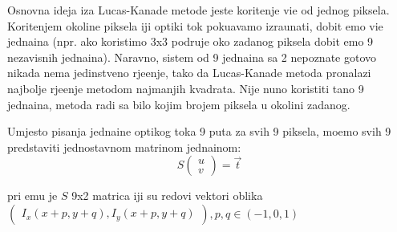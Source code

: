 Osnovna ideja iza Lucas-Kanade metode jeste kori\sh tenje vi\sh e od jednog piksela. Kori\sh tenjem okoline piksela \ch iji opti\ch ki tok poku\sh avamo izra\ch unati, dobit \cj emo vi\sh e jedna\ch ina
(npr. ako koristimo 3x3 podru\ch je oko zadanog piksela dobit \cj emo 9 nezavisnih jedna\ch ina). Naravno, sistem od 9 jedna\ch ina sa 2 nepoznate gotovo nikada nema jedinstveno rje\sh enje,
tako da Lucas-Kanade metoda pronalazi najbolje rje\sh enje metodom najmanjih kvadrata. Nije nu\zh no koristiti ta\ch no 9 jedna\ch ina, metoda radi sa bilo kojim brojem piksela u okolini zadanog.

Umjesto pisanja jedna\ch ine opti\ch kog toka 9 puta za svih 9 piksela, mo\zh emo svih 9 predstaviti jednostavnom matri\ch nom jedna\ch inom:
\[
S
\begin{pmatrix}
u \\
v
\end{pmatrix}
=\vec{t}
\]

pri \ch emu je $S$ 9x2 matrica \ch iji su redovi vektori oblika $\begin{pmatrix}I_x(x+p,y+q),I_y(x+p,y+q)\end{pmatrix},p,q\in (-1,0,1)$